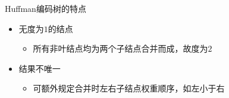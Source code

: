 

\begin{frame}
    \frametitle{\insertsubsectionhead}
    \begin{block}{Huffman编码树的特点}
        \begin{itemize}
            \item 无度为$1$的结点
                \begin{itemize}
                    \item 所有非叶结点均为两个子结点合并而成，故度为$2$
                \end{itemize}
            \item 结果不唯一
                \begin{itemize}
                    \item 可额外规定合并时左右子结点权重顺序，如左小于右
                \end{itemize}
        \end{itemize}
    \end{block}
\end{frame}

